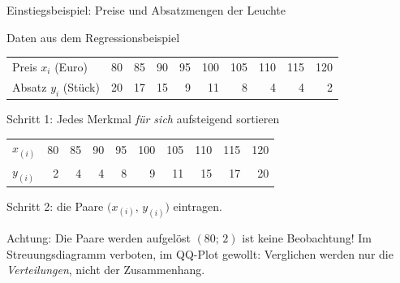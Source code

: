 \documentclass[aspectratio=169,11pt]{beamer}
\begin{document}
\begin{frame}{Einstiegsbeispiel: Preise und Absatzmengen der Leuchte}
  \small
  \begin{block}{Daten aus dem Regressionsbeispiel}
    \begin{center}
      \begin{tabular}{l*{9}{r}}
        \toprule
        Preis $x_i$ (Euro)  & 80 & 85 & 90 & 95 & 100 & 105 & 110 & 115 & 120 \\
        Absatz $y_i$ (Stück) & 20 & 17 & 15 & 9  & 11  & 8   & 4   & 4   & 2   \\
        \bottomrule
      \end{tabular}
    \end{center}
  \end{block}

  \begin{block}{Schritt 1: Jedes Merkmal \emph{für sich} aufsteigend sortieren}
    \begin{center}
      \begin{tabular}{l*{9}{r}}
        \toprule
        $x_{(i)}$ & 80 & 85 & 90 & 95 & 100 & 105 & 110 & 115 & 120 \\
        $y_{(i)}$ & 2  & 4  & 4  & 8  & 9   & 11  & 15  & 17  & 20  \\
        \bottomrule
      \end{tabular}
    \end{center}
    Schritt 2: die Paare $\bigl(x_{(i)},\, y_{(i)}\bigr)$ eintragen.
  \end{block}

  \begin{alertblock}{Achtung: Die Paare werden aufgelöst}
    $(80;\,2)$ ist keine Beobachtung! Im Streuungsdiagramm verboten, im QQ-Plot
    gewollt: Verglichen werden nur die \emph{Verteilungen}, nicht der Zusammenhang.
  \end{alertblock}
\end{frame}
\end{document}
